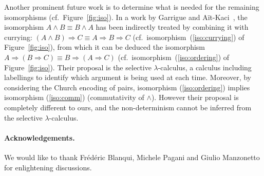 \documentclass[final,copyright,creativecommons]{eptcs}
\theoremstyle{definition}
\begin{document}
Another prominent future work is to determine what is needed for the remaining isomorphisms (cf.~Figure~\ref{fig:iso}).
In a work by Garrigue and A\"it-Kaci~\cite{GarrigueAitkaciPOPL94}, the isomorphism $A\wedge B\equiv B\wedge A$ has been indirectly treated by combining it with currying: $(A\wedge B)\Rightarrow C\equiv A\Rightarrow B\Rightarrow C$ (cf.~isomorphism~(\ref{iso:currying}) of Figure~\ref{fig:iso}), from which it can be deduced the isomorphism $A\Rightarrow (B\Rightarrow C)\equiv B\Rightarrow (A\Rightarrow C)$ (cf.~isomorphism~(\ref{iso:ordering}) of Figure~\ref{fig:iso}). Their proposal is the selective $\lambda$-calculus, a calculus including labellings to identify which argument is being used at each time. Moreover, by considering the Church encoding of pairs, isomorphism (\ref{iso:ordering}) implies isomorphism (\ref{iso:comm}) (commutativity of $\wedge$). However their proposal is completely different to ours, and the non-determinism cannot be inferred from the selective $\lambda$-calculus.

\paragraph{Acknowledgements.} We would like to thank Fr\'ed\'eric Blanqui, Michele Pagani and Giulio Manzonetto for enlightening discussions.




\end{document}
